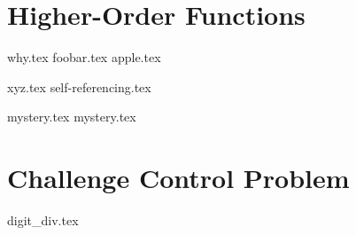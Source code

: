 \documentclass{exam}
\begin{document}
\section{Higher-Order Functions}
\begin{questions}
{why.tex}
{foobar.tex}
{apple.tex}

\newpage
{xyz.tex}
{self-referencing.tex}

\newpage
{mystery.tex}
{mystery.tex}

\newpage
\section{Challenge Control Problem}
{digit_div.tex}

\clearpage

\end{questions}
\end{document}
